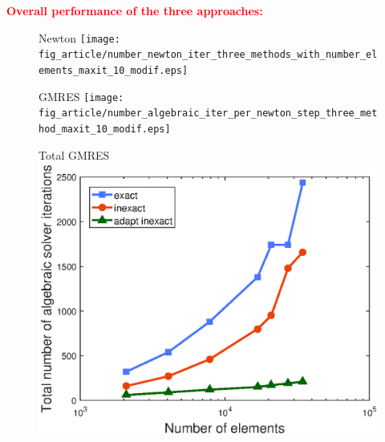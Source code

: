 \documentclass[10 pt]{beamer}
\begin{document}
\begin{frame}


\textcolor{red}{\textbf{Overall performance of the three approaches:}}
\begin{figure}[H]
\begin{minipage}[c]{.40\linewidth}
   \centering 
   Newton
\texttt{[image: fig\_article/number\_newton\_iter\_three\_methods\_with\_number\_elements\_maxit\_10\_modif.eps]}    
\end{minipage}\hfill
\begin{minipage}[c]{.40\linewidth}
\centering
GMRES
\texttt{[image: fig\_article/number\_algebraic\_iter\_per\_newton\_step\_three\_method\_maxit\_10\_modif.eps]}    
\end{minipage} \hfill
\end{figure}
\begin{figure}
\vspace*{-0.04\textwidth} \hspace*{0.1\textwidth}
\begin{minipage}{.47\linewidth} 
\centering   Total GMRES
 \includegraphics[width=\textwidth]{fig_article/number_total_iter_three_methods_with_number_elements_maxit_10.eps}     
\end{minipage} \hfill

\label{ref:figure:plot:number:alg:iter:per:newton:step}
\end{figure}
\end{frame}
\end{document}
